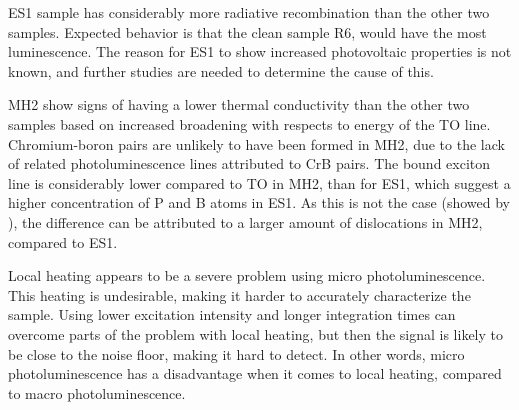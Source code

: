 ES1 sample has considerably more radiative recombination than the other two samples. Expected behavior is that the clean sample R6, would have the most luminescence. The reason for ES1 to show increased photovoltaic properties is not known, and further studies are needed to determine the cause of this.

MH2 show signs of having a lower thermal conductivity than the other two samples based on increased broadening with respects to energy of the TO line. Chromium-boron pairs are unlikely to have been formed in MH2, due to the lack of related photoluminescence lines attributed to CrB pairs. The bound exciton line is considerably lower compared to TO in MH2, than for ES1, which suggest a higher concentration of P and B atoms in ES1. As this is not the case (showed by \cite{hystad09}), the difference can be attributed to a larger amount of dislocations in MH2, compared to ES1.

Local heating appears to be a severe problem using micro photoluminescence. This heating is undesirable, making it harder to accurately characterize the sample. Using lower excitation intensity and longer integration times can overcome parts of the problem with local heating, but then the signal is likely to be close to the noise floor, making it hard to detect. In other words, micro photoluminescence has a disadvantage when it comes to local heating, compared to macro photoluminescence.